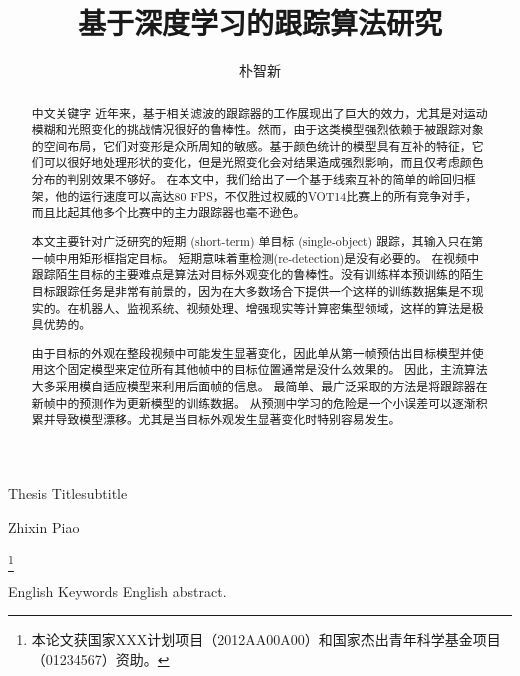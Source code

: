 \documentclass[bachelor]{seuthesis} %
\begin{document}

\title{基于深度学习的跟踪算法研究}{}{Thesis Title}{subtitle}
\author{朴智新}{Zhixin Piao}

\address{河海院2楼}
\thanks{本论文获国家XXX计划项目（2012AA00A00）和国家杰出青年科学基金项目（01234567）资助。}
\maketitle

\begin{abstract}{中文关键字}
近年来，基于相关滤波的跟踪器的工作展现出了巨大的效力，尤其是对运动模糊和光照变化的挑战情况很好的鲁棒性。然而，由于这类模型强烈依赖于被跟踪对象的空间布局，它们对变形是众所周知的敏感。基于颜色统计的模型具有互补的特征，它们可以很好地处理形状的变化，但是光照变化会对结果造成强烈影响，而且仅考虑颜色分布的判别效果不够好。 在本文中，我们给出了一个基于线索互补的简单的岭回归框架，他的运行速度可以高达80 FPS，不仅胜过权威的VOT14比赛上的所有竞争对手，而且比起其他多个比赛中的主力跟踪器也毫不逊色。

本文主要针对广泛研究的短期 (short-term) 单目标 (single-object) 跟踪，其输入只在第一帧中用矩形框指定目标。 短期意味着重检测(re-detection)是没有必要的。 在视频中跟踪陌生目标的主要难点是算法对目标外观变化的鲁棒性。没有训练样本预训练的陌生目标跟踪任务是非常有前景的，因为在大多数场合下提供一个这样的训练数据集是不现实的。在机器人、监视系统、视频处理、增强现实等计算密集型领域，这样的算法是极具优势的。

由于目标的外观在整段视频中可能发生显著变化，因此单从第一帧预估出目标模型并使用这个固定模型来定位所有其他帧中的目标位置通常是没什么效果的。 因此，主流算法大多采用模自适应模型来利用后面帧的信息。 最简单、最广泛采取的方法是将跟踪器在新帧中的预测作为更新模型的训练数据。 从预测中学习的危险是一个小误差可以逐渐积累并导致模型漂移。尤其是当目标外观发生显著变化时特别容易发生。
\end{abstract}

\begin{englishabstract}{English Keywords}
  English abstract.
\end{englishabstract}
\end{document}
